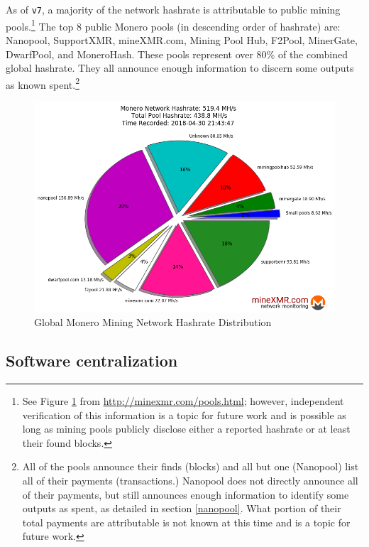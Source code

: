 \documentclass[notitlepage]{report}
\begin{document}
As of \texttt{v7}, a majority of the network hashrate is attributable to public mining pools.\footnote{See Figure \ref{fig:hashrate-distribution} from \url{http://minexmr.com/pools.html}; however, independent verification of this information is a topic for future work and is possible as long as mining pools publicly disclose either a reported hashrate or at least their found blocks.}  The top 8 public Monero pools (in descending order of hashrate) are: Nanopool, SupportXMR, mineXMR.com, Mining Pool Hub, F2Pool, MinerGate, DwarfPool, and MoneroHash.  These pools represent over 80\% of the combined global hashrate.  They all announce enough information to discern some outputs as known spent.\footnote{All of the pools announce their finds (blocks) and all but one (Nanopool) list all of their payments (transactions.)  Nanopool does not directly announce all of their payments, but still announces enough information to identify some outputs as spent, as detailed in section \ref{nanopool}.  What portion of their total payments are attributable is not known at this time and is a topic for future work.}

\begin{figure}[h]
\centering
\includegraphics[width=\textwidth]{global-monero-mining-network-hashrate-distribution-2018-04-30}
\captionsetup{labelformat=empty}
\caption{Global Monero Mining Network Hashrate Distribution}
\label{fig:hashrate-distribution}
\end{figure}

\subsection{Software centralization}
\end{document}
